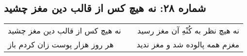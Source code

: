 \begin{center}
\section*{شماره ۲۸: نه هیچ کس از قالب دین مغز چشید}
\label{sec:028}
\begin{longtable}{l p{0.5cm} r}
نه هیچ کس از قالب دین مغز چشید
&&
نه هیچ نظر به کُنْهِ آن مغز رسید
\\
هر روز هزار پوست زان کردم باز
&&
مغزم همه پالوده شد و مغز ندید
\\
\end{longtable}
\end{center}
